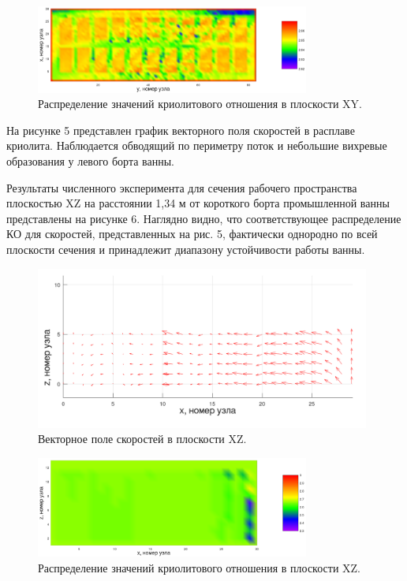 \documentclass{article}
\begin{document}
\begin{figure}[h!]
    \centering
    \includegraphics[width=90mm]{3d xy cr.png}
    \caption{Распределение значений криолитового отношения в плоскости XY.}
    \label{fig:3dxycr} 
\end{figure}

На рисунке 5 представлен график векторного поля скоростей в расплаве криолита. Наблюдается обводящий по периметру поток и небольшие вихревые образования у левого борта ванны.

Результаты численного эксперимента для сечения рабочего пространства плоскостью XZ на расстоянии 1,34 м от короткого борта промышленной ванны представлены на рисунке 6. Наглядно видно, что соответствующее распределение КО для скоростей, представленных на рис. 5, фактически однородно по всей плоскости сечения и принадлежит диапазону устойчивости работы ванны. 

\begin{figure}[h!]
    \centering
    \includegraphics[width=110mm]{veloxz_art.png}
    \caption{Векторное поле скоростей в плоскости XZ.}
    \label{fig:3dxyvelo} 
\end{figure}

\begin{figure}[h!]
    \centering
    \includegraphics[width=90mm]{3d xz cr.png}
    \caption{Распределение значений криолитового отношения в плоскости XZ.}
    \label{fig:3dxycr} 
\end{figure}
\end{document}
